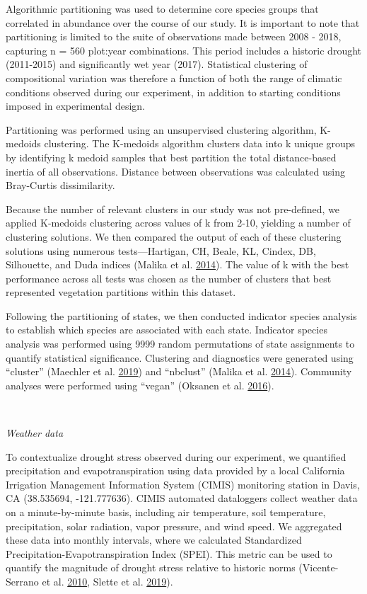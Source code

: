 \documentclass[twoside,12pt,final]{ucthesis-CA2012}
\begin{document}
\begin{ucmainmatter}
Algorithmic partitioning was used to determine core species groups that correlated in abundance over the course of our study.
It is important to note that partitioning is limited to the suite of observations made between 2008 - 2018, capturing n = 560 plot:year combinations.
This period includes a historic drought (2011-2015) and significantly wet year (2017). Statistical clustering of compositional variation was therefore a function of both the range of climatic conditions observed during our experiment, in addition to starting conditions imposed in experimental design.

Partitioning was performed using an unsupervised clustering algorithm, K-medoids clustering.
The K-medoids algorithm clusters data into k unique groups by identifying k medoid samples that best partition the total distance-based inertia of all observations.
Distance between observations was calculated using Bray-Curtis dissimilarity.

Because the number of relevant clusters in our study was not pre-defined, we applied K-medoids clustering across values of k from 2-10, yielding a number of clustering solutions.
We then compared the output of each of these clustering solutions using numerous tests---Hartigan, CH, Beale, KL, Cindex, DB, Silhouette, and Duda indices (Malika et al. \protect\hyperlink{ref-Charrad2014}{2014}).
The value of k with the best performance across all tests was chosen as the number of clusters that best represented vegetation partitions within this dataset.

Following the partitioning of states, we then conducted indicator species analysis to establish which species are associated with each state.
Indicator species analysis was performed using 9999 random permutations of state assignments to quantify statistical significance.
Clustering and diagnostics were generated using ``cluster'' (Maechler et al. \protect\hyperlink{ref-Maechler2019}{2019}) and ``nbclust'' (Malika et al. \protect\hyperlink{ref-Charrad2014}{2014}).
Community analyses were performed using ``vegan'' (Oksanen et al. \protect\hyperlink{ref-Oksanen2016}{2016}).

~

\emph{Weather data}

To contextualize drought stress observed during our experiment, we quantified precipitation and evapotranspiration using data provided by a local California Irrigation Management Information System (CIMIS) monitoring station in Davis, CA (38.535694, -121.777636).
CIMIS automated dataloggers collect weather data on a minute-by-minute basis, including air temperature, soil temperature, precipitation, solar radiation, vapor pressure, and wind speed.
We aggregated these data into monthly intervals, where we calculated Standardized Precipitation-Evapotranspiration Index (SPEI).
This metric can be used to quantify the magnitude of drought stress relative to historic norms (Vicente-Serrano et al. \protect\hyperlink{ref-Vicente-Serrano2010}{2010}, Slette et al. \protect\hyperlink{ref-Slette2019}{2019}).


\end{ucmainmatter}
\end{document}
